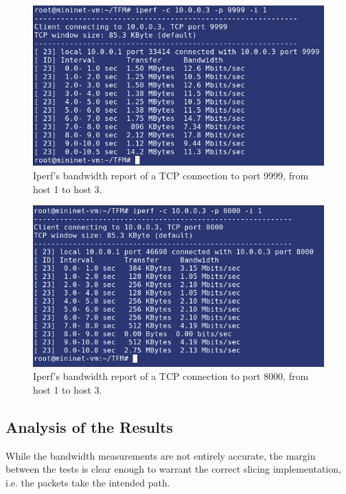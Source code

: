 \begin{figure}
  \centering
  \includegraphics[width=\linewidth]{imagenes/Testing/port_slicing_iperf_fast.png}
  \caption{Iperf's bandwidth report of a TCP connection to port 9999, from host 1 to host 3.}
  \label{fig:iperf_port_9999}
\end{figure}

\begin{figure}
  \centering
  \includegraphics[width=\linewidth]{imagenes/Testing/port_slicing_iperf_slow.png}
  \caption{Iperf's bandwidth report of a TCP connection to port 8000, from host 1 to host 3.}
  \label{fig:iperf_port_8000}
\end{figure}

\subsection{Analysis of the Results}
While the bandwidth measurements are not entirely accurate, the margin between the tests is clear enough to warrant the correct slicing implementation, i.e. the packets take the intended path.



